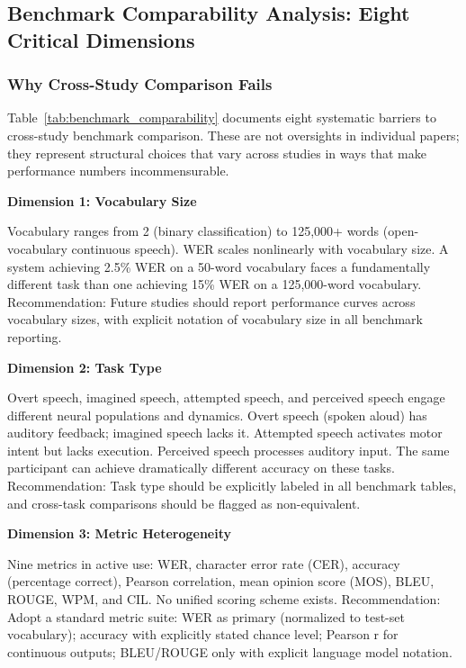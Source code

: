 \subsection{Benchmark Comparability Analysis: Eight Critical Dimensions}
\label{sec:comparability}

\subsubsection{Why Cross-Study Comparison Fails}

Table~\ref{tab:benchmark_comparability} documents eight systematic barriers to cross-study benchmark comparison. These are not oversights in individual papers; they represent structural choices that vary across studies in ways that make performance numbers incommensurable.

\textbf{Dimension 1: Vocabulary Size}

Vocabulary ranges from 2 (binary classification) to 125,000+ words (open-vocabulary continuous speech). WER scales nonlinearly with vocabulary size. A system achieving 2.5\% WER on a 50-word vocabulary faces a fundamentally different task than one achieving 15\% WER on a 125,000-word vocabulary. Recommendation: Future studies should report performance curves across vocabulary sizes, with explicit notation of vocabulary size in all benchmark reporting.

\textbf{Dimension 2: Task Type}

Overt speech, imagined speech, attempted speech, and perceived speech engage different neural populations and dynamics. Overt speech (spoken aloud) has auditory feedback; imagined speech lacks it. Attempted speech activates motor intent but lacks execution. Perceived speech processes auditory input. The same participant can achieve dramatically different accuracy on these tasks. Recommendation: Task type should be explicitly labeled in all benchmark tables, and cross-task comparisons should be flagged as non-equivalent.

\textbf{Dimension 3: Metric Heterogeneity}

Nine metrics in active use: WER, character error rate (CER), accuracy (percentage correct), Pearson correlation, mean opinion score (MOS), BLEU, ROUGE, WPM, and CIL. No unified scoring scheme exists. Recommendation: Adopt a standard metric suite: WER as primary (normalized to test-set vocabulary); accuracy with explicitly stated chance level; Pearson r for continuous outputs; BLEU/ROUGE only with explicit language model notation.

